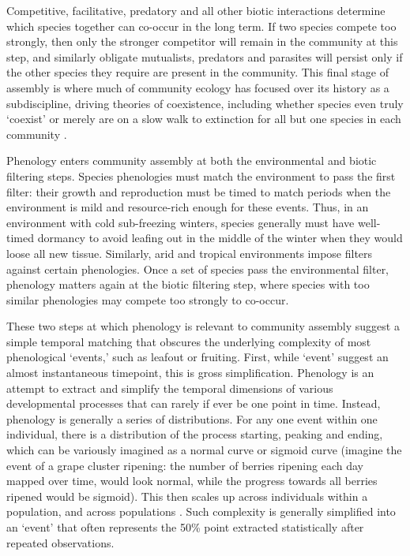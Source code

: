\documentclass[11pt]{article}
\begin{document}
Competitive, facilitative, predatory and all other biotic interactions determine which species together can co-occur in the long term. If two species compete too strongly, then only the stronger competitor will remain in the community at this step, and similarly obligate mutualists, predators and parasites will persist only if the other species they require are present in the community. This final stage of assembly is where much of community ecology has focused over its history as a subdiscipline, driving theories of coexistence, including whether species even truly `coexist' or merely are on a slow walk to extinction for all but one species in each community \citep{Hubbell:2001vo}. 

Phenology enters community assembly at both the environmental and biotic filtering steps. Species phenologies must match the environment to pass the first filter: their growth and reproduction must be timed to match periods when the environment is mild and resource-rich enough for these events. Thus, in an environment with cold sub-freezing winters, species generally must have well-timed dormancy to avoid leafing out in the middle of the winter when they would loose all new tissue. Similarly, arid and tropical environments impose filters against certain phenologies. Once a set of species pass the environmental filter, phenology matters again at the biotic filtering step, where species with too similar phenologies may compete too strongly to co-occur. 

These two steps at which phenology is relevant to community assembly suggest a simple temporal matching that obscures the underlying complexity of most phenological `events,' such as leafout or fruiting. First, while `event' suggest an almost instantaneous timepoint, this is gross simplification. Phenology is an attempt to extract and simplify the temporal dimensions of various developmental processes that can rarely if ever be one point in time. Instead, phenology is generally a series of distributions. For any one event within one individual, there is a distribution of the process starting, peaking and ending, which can be variously imagined as a normal curve or sigmoid curve (imagine the event of a grape cluster ripening: the number of berries ripening each day mapped over time, would look normal, while the progress towards all berries ripened would be sigmoid). This then scales up across individuals within a population, and across populations \citep{inouye2019}. Such complexity is generally simplified into an `event' that often represents the 50\% point extracted statistically after repeated observations. 
\end{document}
